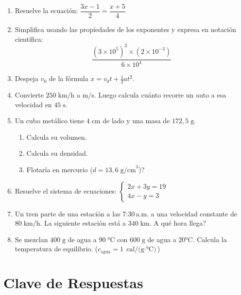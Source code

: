 \documentclass[12pt, letterpaper]{article}
\begin{document}
\begin{enumerate}[leftmargin=*, resume]
  \item Resuelve la ecuación: $\dfrac{3x - 1}{2} = \dfrac{x + 5}{4}$

  \item Simplifica usando las propiedades de los exponentes y expresa en notación científica:
  $$\frac{(3 \times 10^5)^2 \times (2 \times 10^{-3})}{6 \times 10^4}$$

  \item Despeja $v_0$ de la fórmula $x = v_0 t + \frac{1}{2}at^2$.

  \item Convierte $250\;\text{km/h}$ a m/s. Luego calcula cuánto recorre un auto a esa velocidad en $45\;\text{s}$.

  \item Un cubo metálico tiene $4\;\text{cm}$ de lado y una masa de $172{,}5\;\text{g}$.
  \begin{enumerate}[label=\alph*)]
    \item Calcula su volumen.
    \item Calcula su densidad.
    \item \textquestiondown Flotaría en mercurio ($d = 13{,}6\;\text{g/cm}^3$)?
  \end{enumerate}

  \item Resuelve el sistema de ecuaciones:
  $\begin{cases} 2x + 3y = 19 \\ 4x - y = 3 \end{cases}$

  \item Un tren parte de una estación a las 7:30\,a.m. a una velocidad constante de $80\;\text{km/h}$. La siguiente estación está a $340\;\text{km}$. \textquestiondown A qué hora llega?

  \item Se mezclan $400\;\text{g}$ de agua a $90\;\text{°C}$ con $600\;\text{g}$ de agua a $20\text{°C}$. Calcula la temperatura de equilibrio. ($c_{\text{agua}} = 1\;\text{cal/(g$\cdot$°C)}$)
\end{enumerate}

\newpage

\ifmwclaves
\section{Clave de Respuestas}
\end{document}
